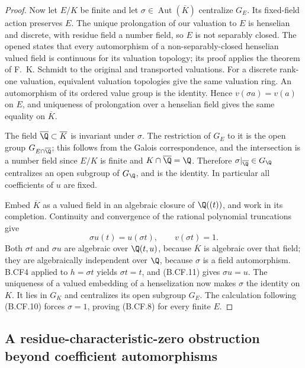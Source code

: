 \begin{proof}
Now let \(E/K\) be finite and let
\(\sigma\in\operatorname{Aut}(\overline K)\) centralize \(G_E\).
Its fixed-field action preserves \(E\). The unique prolongation of
our valuation to \(E\) is henselian and discrete, with residue field
a number field, so \(E\) is not separably closed. The opened
\citep[Lemma~2.1]{KhassaKhanduja2010} states that every automorphism
of a non-separably-closed henselian valued field is continuous for
its valuation topology; its proof applies the theorem of F.\ K.
Schmidt to the original and transported valuations. For a discrete
rank-one valuation, equivalent valuation topologies give the same
valuation ring. An automorphism of its ordered value group is the
identity. Hence \(v(\sigma a)=v(a)\) on \(E\), and uniqueness of
prolongation over a henselian field gives the same equality on
\(\overline K\).

The field \(\overline\Q\subset\overline K\) is invariant under
\(\sigma\). The restriction of \(G_E\) to it is the open group
\(G_{E\cap\overline\Q}\); this follows from the Galois
correspondence, and the intersection is a number field since
\(E/K\) is finite and \(K\cap\overline\Q=\Q\). Therefore
\(\sigma|_{\overline\Q}\in G_\Q\) centralizes an open subgroup
of \(G_\Q\), and is the identity. In particular all coefficients
of \(u\) are fixed.

Embed \(\overline K\) as a valued field in an algebraic closure of
\(\Q((t))\), and work in its completion. Continuity and convergence
of the rational polynomial truncations give
\[
          \sigma u(t)=u(\sigma t),\qquad v(\sigma t)=1.
                                                        \tag{B.CF.11}
\]
Both \(\sigma t\) and \(\sigma u\) are algebraic over
\(\Q(t,u)\), because \(\overline K\) is algebraic over that
field; they are algebraically independent over \(\Q\), because
\(\sigma\) is a field automorphism. B.CF4 applied to
\(h=\sigma t\) yields \(\sigma t=t\), and (B.CF.11) gives
\(\sigma u=u\). The uniqueness of a valued embedding of a
henselization now makes \(\sigma\) the identity on \(K\).
It lies in \(G_K\) and centralizes its open subgroup \(G_E\).
The calculation following (B.CF.10) forces \(\sigma=1\), proving
(B.CF.8) for every finite \(E\).
\end{proof}

\subsection{A residue-characteristic-zero obstruction beyond coefficient automorphisms}

